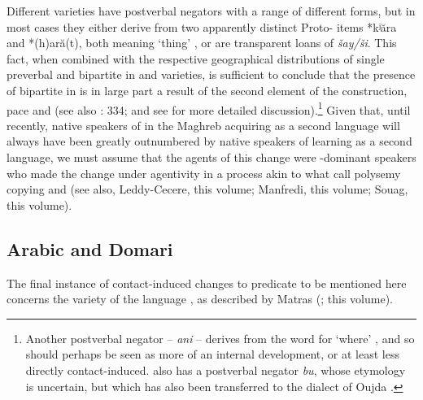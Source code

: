 \documentclass[output=paper]{langsci/langscibook}
\begin{document}
{Different  varieties have postverbal negators with a range of different forms, but in most cases they either derive from two apparently distinct Proto- items *kʲăra and *(h)ară(t), both meaning ‘thing’ \citep[332]{Kossmann2013book}, or are transparent loans of  \textit{šay/ši}. This fact, when combined with the respective geographical distributions of single preverbal and bipartite  in  and  varieties, is sufficient to conclude that the presence of bipartite  in  is in large part a result of  the second element of the  construction, pace \citet{Brugnatelli1987} and \citet{Lafkioui2013reinventing} (see also \citealt{Kossmann2013book}: 334; and see \citealt{Lucas2007,Lucas2009} for more detailed discussion).\footnote{Another postverbal negator –  \textit{ani} – derives from the word for ‘where’ \citep{Rabhi1992}, and so should perhaps be seen as more of an internal development, or at least less directly contact-induced.  also has a postverbal negator \textit{bu}, whose etymology is uncertain, but which has also been transferred to the   dialect of Oujda \citep{Lafkioui2013bu}.} Given that, until recently, native speakers of  in the Maghreb acquiring  as a second language will always have been greatly outnumbered by native speakers of  learning  as a second language, we must assume that the agents of this change were -dominant speakers who made the change under  agentivity in a process akin to what \citet{HeineKuteva2005} call polysemy copying and  (see also, Leddy-Cecere, this volume; Manfredi, this volume; Souag, this volume).}


\subsection{Arabic and Domari}\largerpage


The final instance of contact-induced changes to predicate  to be mentioned here concerns the  variety of the  language , as described by Matras (\citeyear{Matras1999,Matras2007Domari,Matras2012}; this volume).
\end{document}
